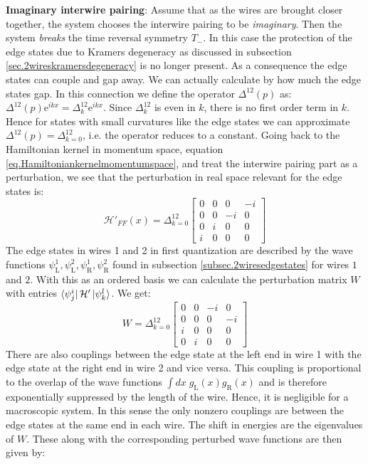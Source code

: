 \textbf{Imaginary interwire pairing}: Assume that as the wires are brought closer together, the system chooses the interwire pairing to be \textit{imaginary}. Then the system \textit{breaks} the time reversal symmetry $T_-$. In this case the protection of the edge states due to Kramers degeneracy as discussed in subsection \ref{sec.2wireskramersdegeneracy} is no longer present. As a consequence the edge states can couple and gap away. We can actually calculate by how much the edge states gap. In this connection we define the operator $\Delta^{12}(p)$ as: $\Delta^{12}(p)\text{e}^{ikx} = \Delta^{12}_k\text{e}^{ikx}$. Since $\Delta^{12}_k$ is even in $k$, there is no first order term in $k$. Hence for states with small curvatures like the edge states we can approximate $\Delta^{12}(p) = \Delta^{12}_{k=0}$, i.e. the operator reduces to a constant. Going back to the Hamiltonian kernel in momentum space, equation \eqref{eq.Hamiltoniankernelmomentumspace}, and treat the interwire pairing part as a perturbation, we see that the perturbation in real space relevant for the edge states is:
\begin{equation}
\mathcal{H}'_{FF}(x) = \Delta^{12}_{k=0}\begin{bmatrix} 
0 & 0 &  0 & -i \\
0 & 0 & -i & 0 \\
0 & i & 0  & 0 \\
i & 0 & 0  & 0  \end{bmatrix}
\label{eq.interwirepairingrealspace}
\end{equation}
The edge states in wires 1 and 2 in first quantization are described by the wave functions $\psi^1_{\text{L}}, \psi^2_{\text{L}}, \psi^1_{\text{R}}, \psi^2_{\text{R}}$ found in subsection \ref{subsec.2wiresedgestates} for wires $1$ and $2$. With this as an ordered basis we can calculate the perturbation matrix $W$ with entries $\bra{\psi^{i}_j}\mathcal{H}'\ket{\psi^{l}_k}$. We get:
\begin{equation}
W = \Delta^{12}_{k=0} \begin{bmatrix} 
0 & 0 & -i &  0 \\
0 & 0 &  0 & -i \\
i & 0 &  0 & 0 \\
0 & i &  0 & 0 \end{bmatrix} \nonumber
\end{equation}  
There are also couplings between the edge state at the left end in wire 1 with the edge state at the right end in wire 2 and vice versa. This coupling is proportional to the overlap of the wave functions $\int dx \; g_{\text{L}}(x)g_{\text{R}}(x)$ and is therefore exponentially suppressed by the length of the wire. Hence, it is negligible for a macroscopic system. In this sense the only nonzero couplings are between the edge states at the same end in each wire. The shift in energies are the eigenvalues of $W$. These along with the corresponding perturbed wave functions are then given by:

